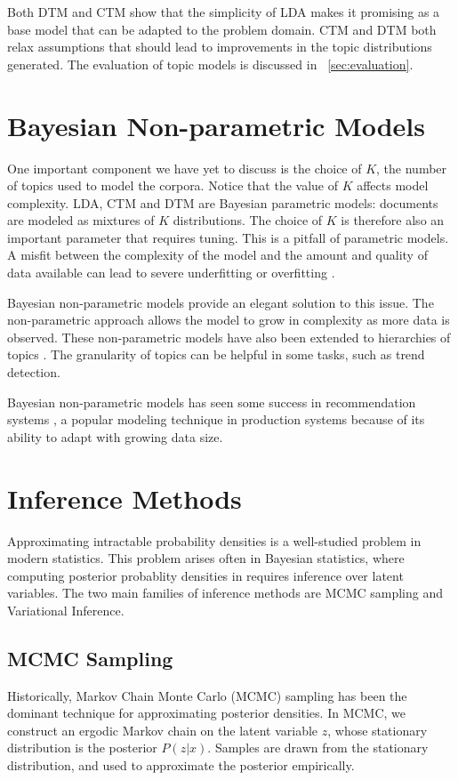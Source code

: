 \documentclass[letterpaper]{article}
\begin{document}
Both DTM and CTM show that the simplicity of LDA makes it promising as
a base model that can be adapted to the problem domain. CTM and DTM both
relax assumptions that should lead to improvements in the topic
distributions generated. The evaluation of topic models is discussed
in ~\autoref{sec:evaluation}.

\section{Bayesian Non-parametric Models}
One important component we have yet to discuss is the choice of $K$,
the number of topics used to model the corpora. Notice that the value
of $K$ affects model complexity. LDA, CTM and DTM are Bayesian
parametric models: documents are modeled as mixtures of $K$
distributions. The choice of $K$ is therefore also an important
parameter that requires tuning. This is a pitfall of parametric
models. A misfit between the complexity of the model and the amount
and quality of data available can lead to severe underfitting or
overfitting \cite{teh2011dirichlet}.

Bayesian non-parametric models provide an elegant solution to this
issue. The non-parametric approach allows the model to grow in
complexity as more data is observed. These non-parametric models have
also been extended to hierarchies of topics \cite{blei2010nested}. The
granularity of topics can be helpful in some tasks, such as trend
detection.

Bayesian non-parametric models has seen some success in recommendation
systems \cite{gopalan2014bayesian}, a popular modeling technique in
production systems because of its ability to adapt with growing data
size.

\section{Inference Methods}
\label{sec:inference}
Approximating intractable probability densities is a well-studied
problem in modern statistics. This problem arises often in Bayesian
statistics, where computing posterior probablity densities in requires
inference over latent variables. The two main families of inference
methods are MCMC sampling and Variational Inference.

\subsection{MCMC Sampling}
\label{subsec:mcmc-sampling}
Historically, Markov Chain Monte Carlo (MCMC) sampling has been the
dominant technique for approximating posterior densities. In MCMC, we
construct an ergodic Markov chain on the latent variable $z$,
whose stationary distribution is the posterior $P( z | x)$.
Samples are drawn from the stationary distribution, and used to
approximate the posterior empirically.
\end{document}
